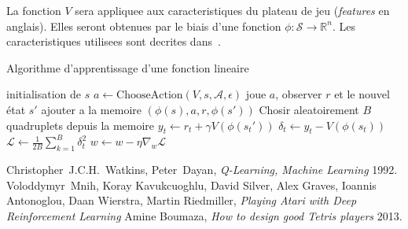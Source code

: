 \documentclass{article}
\newcommand{\R}{\mathbb{R}}
\begin{document}
La fonction \(V\) sera appliquee aux caracteristiques du plateau de jeu
(\textit{features} en anglais). Elles seront obtenues par le biais d'une
fonction \(\phi\colon \mathcal{S} \to \R^n\). Les caracteristiques utilisees
sont decrites dans~\cite{boumaza13}.
\begin{algorithm}
  \caption{Algorithme d'apprentissage d'une fonction lineaire}\label{alg:linfct}
  \begin{algorithmic}
    [1]
    \Repeat{}
    \State{} initialisation de \(s\)
    \Repeat{}
    \State{} \(a \gets \mathup{ChooseAction}(V, s, \mathcal{A}, \epsilon)\)
    \State{} joue \(a\), observer \(r\) et le nouvel \'etat \(s'\)
    \State{} ajouter a la memoire \( \left(\phi(s), a, r, \phi(s')\right) \)
    \EndFor{}
    \State{} Chosir aleatoirement \(B\) quadruplets depuis la memoire
    \State{} \(y_t \gets r_t + \gamma V\left(\phi(s_t')\right)\)
    \State{} \(\delta_t \gets y_t - V \left(\phi(s_t)\right)\)
    \State{} \(\mathcal{L} \gets \frac{1}{2B}\sum_{k=1}^B \delta_t^2\)
    \State{} \(w \gets w - \eta \nabla_w \mathcal{L}\)
    \EndProcedure{}
  \end{algorithmic}
\end{algorithm}

\begin{thebibliography}{9}
    Christopher~J.C.H.~Watkins, Peter~Dayan,
    \textit{Q-Learning, Machine Learning}
    1992.
    Voloddymyr~Mnih, Koray Kavukcuoghlu, David Silver, Alex Graves, Ioannis
    Antonoglou, Daan Wierstra, Martin Riedmiller,
    \textit{Playing Atari with Deep Reinforcement Learning}
    Amine Boumaza,
    \textit{How to design good Tetris players}
    2013.
\end{thebibliography}
\end{document}
